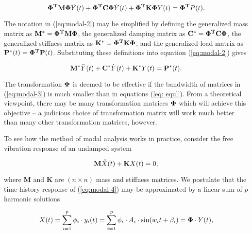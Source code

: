 \begin{equation}
{\bf \Phi^T} {\bf M} {\bf \Phi} {\ddot Y}(t) +
{\bf \Phi^T} {\bf C} {\bf \Phi} {\dot Y}(t) +
{\bf \Phi^T} {\bf K} {\bf \Phi} {Y}(t) = {\bf \Phi^T} {P}(t).
\label{eq:modal-2}
\end{equation}

\vspace{0.15 in}\noindent
The notation in (\ref{eq:modal-2}) may be
simplified by defining the generalized mass matrix as
${\bf M^*} = {\bf \Phi^T} {\bf M} {\bf \Phi}$,
the generalized damping matrix as
${\bf C^*} = {\bf \Phi^T} {\bf C} {\bf \Phi}$,
the generalized stiffness matrix as
${\bf K^*} = {\bf \Phi^T} {\bf K} {\bf \Phi}$,
and the generalized load matrix as
${\bf P^*}(t) = {\bf \Phi^T} {\bf P}(t)$.
Substituting these definitions into equation (\ref{eq:modal-2}) gives

\begin{equation}
{\bf M^*} {\ddot Y}(t) + {\bf C^*} {\dot Y}(t) +
{\bf K^*} Y(t) = {\bf P^*}(t).
\label{eq:modal-3}
\end{equation}

\vspace{0.15 in}\noindent
The transformation ${\bf \Phi}$ is deemed to be effective if
the bandwidth of matrices in (\ref{eq:modal-3}) is
much smaller than in equations (\ref{eq: equl}). From a
theoretical viewpoint, there may be many transformation matrices
${\bf \Phi}$ which will achieve this objective -- a judicious choice of
transformation matrix will work much better than
many other transformation matrices, however.

\vspace{0.15 in}
\noindent\hspace{0.50 in}
To see how the method of modal analysis works in practice,
consider the free vibration response of an undamped system

\begin{equation}
{\bf M} {\ddot X}(t) + {\bf K} X(t) = 0,
\label{eq:modal-4}
\end{equation}

\vspace{0.15 in}\noindent
where {\bf M} and {\bf K} are $(n \times n)$ mass and stiffness matrices.
We postulate that the time-history response of (\ref{eq:modal-4})
may be approximated by a linear sum of $p$ harmonic solutions

\begin{equation}
X(t) = \sum_{i = 1}^{p} \phi_i \cdot y_i(t) =
\sum_{i = 1}^{p} \phi_i \cdot A_i \cdot \hbox{sin} (w_i t + \beta_i) = {\bf \Phi} \cdot Y(t),
\label{eq:modal-5}
\end{equation}

